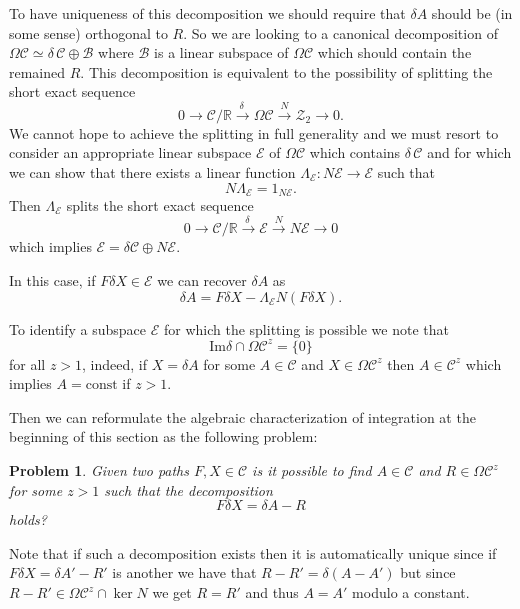 \documentclass[a4paper,12pt,reqno]{amsproc}
\newcommand{\der}{\delta\!}
\newcommand{\RR}{\mathbb{R}}
\newcommand{\NN}{N}
\newcommand{\CC}{\mathcal{C}}
\newcommand{\ZZ}{\mathcal{Z}}
\newcommand{\OCC}{\Omega \mathcal{C}}
\newtheorem{problem}{Problem}
\begin{document}
To have uniqueness of this decomposition we should require that $\der A$
should be (in some sense) orthogonal to $R$.  
So we are looking to a canonical decomposition of $\OCC \simeq \der\, \CC
\oplus \mathcal{B}$ where $\mathcal{B}$ is a linear subspace of $\OCC$
which should contain the remained $R$. This decomposition is equivalent to the
possibility of splitting the
short exact sequence
\begin{equation*}
 0 \rightarrow \CC/\RR \stackrel{\der\ }{\longrightarrow} \OCC
 \stackrel{\NN}{\longrightarrow} \ZZ_2 \rightarrow 0.
\end{equation*}
We cannot hope to achieve the splitting in full generality and we must
resort to consider an appropriate linear subspace $\mathcal{E}$ of
$\OCC$ which contains $\der\,\CC$ and for
which we can show that there exists a linear function $\Lambda_{\mathcal{E}} : \NN
\mathcal{E} \to \mathcal{E}$ such that 
$$
\NN \Lambda_{\mathcal{E}} = 1_{\NN \mathcal{E}}.
$$ 
Then $\Lambda_{\mathcal{E}}$ splits the short exact sequence
\begin{equation*}
 0 \rightarrow \mathcal{C}/\mathbb{R} \stackrel{\der\ }{\longrightarrow} \mathcal{E}
 \stackrel{\NN}{\longrightarrow} \NN{\mathcal{E}} \rightarrow 0
\end{equation*}
which implies $\mathcal{E} = \delta \mathcal{C} \oplus \NN \mathcal{E}$.

In this case, if $F \der X \in \mathcal{E}$ we can recover $\der A$ as
\begin{equation}
  \label{eq:split1}
\der A = F \der X - \Lambda_{\mathcal{E}} \NN (F\der X).  
\end{equation}


To identify a subspace $\mathcal{E}$ for which the splitting is possible we
note that $$\text{Im} \delta \cap \OCC^z = \{ 0 \}$$ for all
$z > 1$, indeed, if $X = \der A$ for some $A \in
\CC$ and $X \in \OCC^z$ then  $A \in \CC^z$ which implies $A = \text{const}$ if $z > 1$. 

Then we can reformulate the algebraic characterization of integration at
the beginning of this section as the following problem:
\begin{problem}
\label{prob:1}
Given
two paths $F,X \in \CC$ is it possible to find $A \in \CC$ and $R \in
\OCC^z$ for some $z > 1$ such that  the decomposition
\begin{equation}
\label{eq:problem0}
  F \der X = \der A - R
\end{equation}
holds?  
\end{problem}
Note that if such a decomposition exists then it is
automatically unique since if $F \der X = \der A' - R'$ is another we have that
$R - R' = \der(A-A')$ but since $R-R' \in \OCC^{z} \cap \ker \NN$ we get $R =
R'$ and thus $A = A'$ modulo a constant. 
\end{document}
